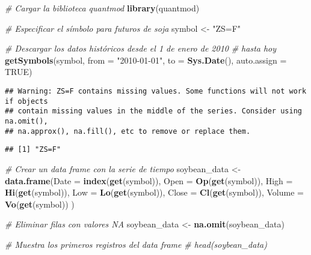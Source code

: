 \documentclass[
]{book}
\newenvironment{Shaded}{\begin{snugshade}}{\end{snugshade}}
\newcommand{\AttributeTok}[1]{\textcolor[rgb]{0.13,0.29,0.53}{#1}}
\newcommand{\CommentTok}[1]{\textcolor[rgb]{0.56,0.35,0.01}{\textit{#1}}}
\newcommand{\ConstantTok}[1]{\textcolor[rgb]{0.56,0.35,0.01}{#1}}
\newcommand{\FunctionTok}[1]{\textcolor[rgb]{0.13,0.29,0.53}{\textbf{#1}}}
\newcommand{\NormalTok}[1]{#1}
\newcommand{\OtherTok}[1]{\textcolor[rgb]{0.56,0.35,0.01}{#1}}
\newcommand{\StringTok}[1]{\textcolor[rgb]{0.31,0.60,0.02}{#1}}
\begin{document}
\begin{Shaded}
\begin{Highlighting}[]
\CommentTok{\# Cargar la biblioteca quantmod}
\FunctionTok{library}\NormalTok{(quantmod)}

\CommentTok{\# Especificar el símbolo para futuros de soja}
\NormalTok{symbol }\OtherTok{\textless{}{-}} \StringTok{"ZS=F"}

\CommentTok{\# Descargar los datos históricos desde el 1 de enero de 2010 }
\CommentTok{\# hasta hoy}
\FunctionTok{getSymbols}\NormalTok{(symbol, }\AttributeTok{from =} \StringTok{"2010{-}01{-}01"}\NormalTok{, }\AttributeTok{to =} \FunctionTok{Sys.Date}\NormalTok{(), }
\AttributeTok{auto.assign =} \ConstantTok{TRUE}\NormalTok{)}
\end{Highlighting}
\end{Shaded}

\begin{verbatim}
## Warning: ZS=F contains missing values. Some functions will not work if objects
## contain missing values in the middle of the series. Consider using na.omit(),
## na.approx(), na.fill(), etc to remove or replace them.
\end{verbatim}

\begin{verbatim}
## [1] "ZS=F"
\end{verbatim}

\begin{Shaded}
\begin{Highlighting}[]
\CommentTok{\# Crear un data frame con la serie de tiempo}
\NormalTok{soybean\_data }\OtherTok{\textless{}{-}} \FunctionTok{data.frame}\NormalTok{(}\AttributeTok{Date =} \FunctionTok{index}\NormalTok{(}\FunctionTok{get}\NormalTok{(symbol)), }
                           \AttributeTok{Open =} \FunctionTok{Op}\NormalTok{(}\FunctionTok{get}\NormalTok{(symbol)),}
                           \AttributeTok{High =} \FunctionTok{Hi}\NormalTok{(}\FunctionTok{get}\NormalTok{(symbol)),}
                           \AttributeTok{Low =} \FunctionTok{Lo}\NormalTok{(}\FunctionTok{get}\NormalTok{(symbol)),}
                           \AttributeTok{Close =} \FunctionTok{Cl}\NormalTok{(}\FunctionTok{get}\NormalTok{(symbol)),}
                           \AttributeTok{Volume =} \FunctionTok{Vo}\NormalTok{(}\FunctionTok{get}\NormalTok{(symbol))}
\NormalTok{                           )}

\CommentTok{\# Eliminar filas con valores NA}
\NormalTok{soybean\_data }\OtherTok{\textless{}{-}} \FunctionTok{na.omit}\NormalTok{(soybean\_data)}

\CommentTok{\# Muestra los primeros registros del data frame}
\CommentTok{\# head(soybean\_data)}
\end{Highlighting}
\end{Shaded}
\end{document}
